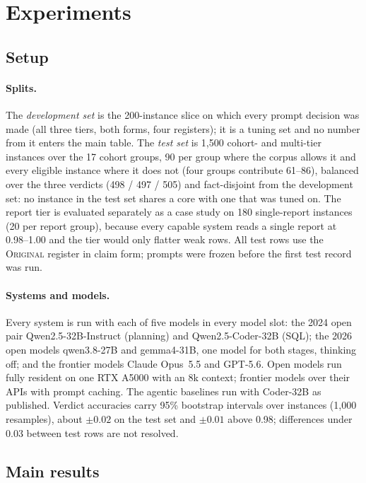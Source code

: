 \section{Experiments}
\label{sec:experiments}

\subsection{Setup}
\label{sec:setup}

\paragraph{Splits.} The \emph{development set} is the 200-instance slice on
which every prompt decision was made (all three tiers, both forms, four
registers); it is a tuning set and no number from it enters the main table.
The \emph{test set} is 1{,}500 cohort- and multi-tier instances over the 17
cohort groups, 90 per group where the corpus allows it and every eligible
instance where it does not (four groups contribute 61--86), balanced over the
three verdicts (498 / 497 / 505) and fact-disjoint from the development set:
no instance in the test set shares a core with one that was tuned on. The
report tier is evaluated separately as a case study on 180 single-report
instances (20 per report group), because every capable system reads a single
report at 0.98--1.00 and the tier would only flatter weak rows. All test rows
use the \textsc{Original} register in claim form; prompts were frozen before
the first test record was run.

\paragraph{Systems and models.} Every system is run with each of five models
in every model slot: the 2024 open pair Qwen2.5-32B-Instruct (planning) and
Qwen2.5-Coder-32B (SQL); the 2026 open models qwen3.8-27B and gemma4-31B, one
model for both stages, thinking off; and the frontier models Claude Opus~5.5
and GPT-5.6. Open models run fully resident on one RTX A5000 with an 8k
context; frontier models over their APIs with prompt caching. The agentic
baselines run with Coder-32B as published. Verdict accuracies carry 95\%
bootstrap intervals over instances (1{,}000 resamples), about $\pm 0.02$ on
the test set and $\pm 0.01$ above 0.98; differences under 0.03 between test
rows are not resolved.

\subsection{Main results}
\label{sec:main}

